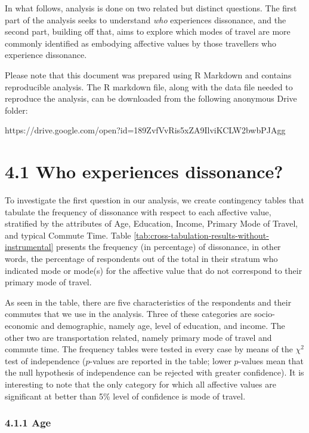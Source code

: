 \documentclass[]{elsarticle} %
\begin{document}
In what follows, analysis is done on two related but distinct questions.
The first part of the analysis seeks to understand \emph{who}
experiences dissonance, and the second part, building off that, aims to
explore which modes of travel are more commonly identified as embodying
affective values by those travellers who experience dissonance.

Please note that this document was prepared using R Markdown and
contains reproducible analysis. The R markdown file, along with the data
file needed to reproduce the analysis, can be downloaded from the
following anonymous Drive folder:

https://drive.google.com/open?id=189ZvfVvRis5xZA9IlviKCLW2bwbPJAgg

\hypertarget{who-experiences-dissonance}{%
\section{4.1 Who experiences
dissonance?}\label{who-experiences-dissonance}}

To investigate the first question in our analysis, we create contingency
tables that tabulate the frequency of dissonance with respect to each
affective value, stratified by the attributes of Age, Education, Income,
Primary Mode of Travel, and typical Commute Time. Table
\ref{tab:cross-tabulation-results-without-instrumental} presents the
frequency (in percentage) of dissonance, in other words, the percentage
of respondents out of the total in their stratum who indicated mode or
mode(s) for the affective value that do not correspond to their primary
mode of travel.

As seen in the table, there are five characteristics of the respondents
and their commutes that we use in the analysis. Three of these
categories are socio-economic and demographic, namely age, level of
education, and income. The other two are transportation related, namely
primary mode of travel and commute time. The frequency tables were
tested in every case by means of the \(\chi^2\) test of independence
(\(p\)-values are reported in the table; lower \(p\)-values mean that
the null hypothesis of independence can be rejected with greater
confidence). It is interesting to note that the only category for which
all affective values are significant at better than 5\% level of
confidence is mode of travel.

\hypertarget{age}{%
\subsubsection{4.1.1 Age}\label{age}}
\end{document}
